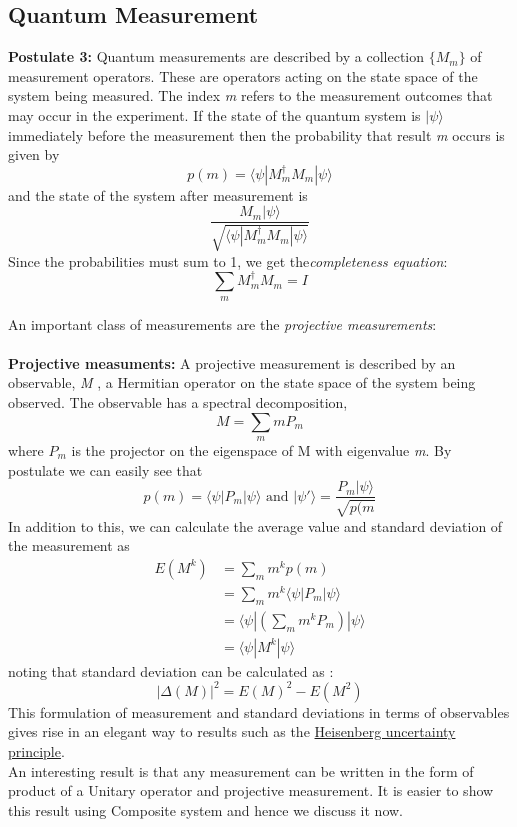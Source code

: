 \subsection{Quantum Measurement}
{\bf Postulate 3: } Quantum measurements are described by a collection $\{ M_m \}$ of measurement operators. These are operators acting on the state space of the system being measured. The index {\it m} refers to the measurement outcomes that may occur in the experiment. If the state of the quantum system is $|\psi\rangle$ immediately before the measurement then the probability that result {\it m} occurs is given by 
\begin{equation}
p(m) = \langle \psi| M^\dagger _m M_m |\psi \rangle
\end{equation}and the state of the system after measurement is 
\begin{equation}
\frac{M_m|\psi\rangle}{\sqrt{\langle \psi| M^\dagger _m M_m |\psi \rangle}}
\end{equation}Since the probabilities must sum to 1, we get the{\it completeness equation}:
\begin{equation}
\sum_m  M^\dagger _m M_m = I
\end{equation}

An important class of measurements are the {\it projective measurements}:  \\\\
{\bf Projective measuments: }A projective measurement is described by an observable, {\it M} , a Hermitian operator on the state space of the system being observed. The observable has a spectral decomposition,
\begin{equation}
M=\sum _m mP_m
\end{equation}
where $P_m$ is the projector on the eigenspace of M with eigenvalue {\it m}. By postulate we can easily see that 
\begin{equation}
p(m) = \langle \psi| P_m |\psi \rangle \text{ and } 
|\psi'\rangle = \frac{P_m |\psi\rangle}{\sqrt{p(m}}
\end{equation}In addition to this, we can calculate the average value and standard deviation of the measurement as \\
\begin{equation}
\begin{split}
 E(M^k) & = \sum_m m^k p(m)\\
& = \sum_m m^k \langle \psi| P_m |\psi \rangle \\
& = \langle \psi| \left( \sum_m m^k P_m  \right) |\psi \rangle \\
& =  \langle \psi| M^k |\psi \rangle
\end{split}
\end{equation}noting that standard deviation can be calculated as : 
\[ |\Delta(M)|^2 = E(M)^2 - E(M^2)\]
This formulation of measurement and standard deviations in terms of observables gives rise in
an elegant way to results such as the \href{https://en.wikipedia.org/wiki/Uncertainty_principle}{Heisenberg uncertainty principle}.\\
An interesting result is that any measurement can be written in the form of product of a Unitary operator and projective measurement. It is easier to show this result using Composite system and hence we discuss it now.

